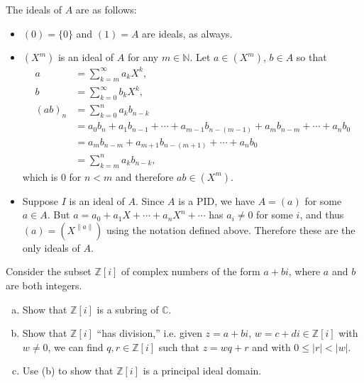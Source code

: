 \documentclass{article}
\newcounter{Problem}
\newenvironment{Problem}{\begin{Exercise}[name={Problem},
                                          counter={Problem}]}
                        {\end{Exercise}}
\begin{document}
\begin{Answer}
\begin{enumerate}[(a)]
{      The ideals of $A$ are as follows:
      \begin{itemize}
        \item{
          $(0) = \{ 0 \}$ and $(1) = A$ are ideals, as always.
        }
        \item{
          $(X^m)$ is an ideal of $A$ for any $m \in \mathbb{N}$. Let
          $a \in (X^m)$, $b \in A$ so that
          \begin{align*}
            a       &= \sum_{k=m}^\infty a_k X^k, \\
            b       &= \sum_{k=0}^\infty b_k X^k, \\
            (a b)_n &= \sum_{k=0}^n a_k b_{n-k} \\
                    &= a_0 b_n
                     + a_1 b_{n-1}
                     + \cdots
                     + a_{m-1} b_{n-(m-1)}
                     + a_m b_{n - m}
                     + \cdots
                     + a_n b_0 \\
                    &= a_m b_{n-m}
                     + a_{m+1} b_{n-(m+1)}
                     + \cdots
                     + a_n b_0 \\
                    &= \sum_{k=m}^n a_k b_{n - k},
          \end{align*}
          which is 0 for $n < m$ and therefore $ab \in (X^m)$.
        }
        \item{
          Suppose $I$ is an ideal of $A$. Since $A$ is a
          PID, we have $A = (a)$ for some $a \in A$. But
          $a = a_0 + a_1X + \cdots + a_nX^n + \cdots$ has
          $a_i \neq 0$ for some $i$, and thus
          $(a) = (X^{\|a\|})$ using the notation defined above.
          Therefore these are the only ideals of $A$.
        }
      \end{itemize}
    }
  \end{enumerate}
\end{Answer}

\pagebreak

\begin{Problem}
  Consider the subset $\mathbb{Z}[i]$ of complex numbers of the form
  $a + bi$, where $a$ and $b$ are both integers.
  \begin{enumerate}[(a)]
    \item{
      Show that $\mathbb{Z}[i]$ is a subring of $\mathbb{C}$.
    }
    \item{
      Show that $\mathbb{Z}[i]$ ``has division,'' i.e. given
      $z = a + bi$, $w = c + di \in \mathbb{Z}[i]$ with $w \neq 0$, we
      can find $q, r \in \mathbb{Z}[i]$ such that $z = wq + r$ and
      with $0 \leq |r| < |w|$.
    }
    \item{
      Use (b) to show that $\mathbb{Z}[i]$ is a principal ideal domain.
    }
  \end{enumerate}
\end{Problem}
\end{document}
